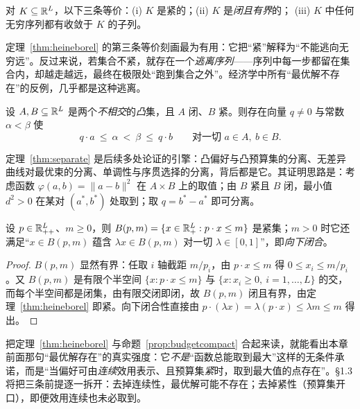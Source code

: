 \begin{theorem}\label{thm:heineborel}
对 $K\subseteq\mathbb{R}^{L}$，以下三条等价：(i) $K$ 是紧的；(ii) $K$ 是\emph{闭且有界}的；
(iii) $K$ 中任何无穷序列都有收敛于 $K$ 的子列。
\end{theorem}

定理~\ref{thm:heineborel} 的第三条等价刻画最为有用：它把“紧”解释为“不能逃向无穷远”。反过来说，若集合不紧，就存在一个\emph{逃离序列}——序列中每一步都留在集合内，却越走越远，最终在极限处“跑到集合之外”。经济学中所有“最优解不存在”的反例，几乎都是这种逃离。

\begin{theorem}\label{thm:separate}
设 $A,B\subseteq\mathbb{R}^{L}$ 是两个\emph{不相交}的\emph{凸}集，且 $A$ 闭、$B$ 紧。则存在向量 $q\neq 0$ 与常数 $\alpha<\beta$ 使
\[
q\cdot a\ \le\ \alpha\ <\ \beta\ \le\ q\cdot b\qquad
\text{对一切 }a\in A,\ b\in B.
\]
\end{theorem}

定理~\ref{thm:separate} 是后续多处论证的引擎：凸偏好与凸预算集的分离、无差异曲线对最优束的分离、单调性与序贯选择的分离，背后都是它。其证明思路是：考虑函数 $\varphi(a,b)=\|a-b\|^{2}$ 在 $A\times B$ 上的取值；由 $B$ 紧且 $B$ 闭，最小值 $d^{2}>0$ 在某对 $(a^{*},b^{*})$ 处取到；取 $q=b^{*}-a^{*}$ 即可分离。

\begin{proposition}[预算集是紧集]\label{prop:budgetcompact}
设 $p\in\mathbb{R}_{++}^{L}$、$m\ge 0$，则 $B(p,m)=\{x\in\mathbb{R}^{L}_{+}:p\cdot x\le m\}$ 是紧集；$m>0$ 时它还满足“$x\in B(p,m)$ 蕴含 $\lambda x\in B(p,m)$ 对一切 $\lambda\in[0,1]$”，即\emph{向下闭合}。
\end{proposition}

\begin{proof}
$B(p,m)$ 显然有界：任取 $i$ 轴截距 $m/p_i$，由 $p\cdot x\le m$ 得 $0\le x_i\le m/p_i$。又 $B(p,m)$ 是有限个半空间 $\{x:p\cdot x\le m\}$ 与 $\{x:x_i\ge 0,\ i=1,\dots,L\}$ 的交，而每个半空间都是闭集，由有限交闭即闭，故 $B(p,m)$ 闭且有界，由定理~\ref{thm:heineborel} 即紧。向下闭合性直接由 $p\cdot(\lambda x)=\lambda(p\cdot x)\le\lambda m\le m$ 得出。
\end{proof}

把定理~\ref{thm:heineborel} 与命题~\ref{prop:budgetcompact} 合起来读，就能看出本章前面那句“最优解存在”的真实强度：它\emph{不是}“函数总能取到最大”这样的无条件承诺，而是“当偏好可由\emph{连续}效用表示、且预算集\emph{紧}时，取到最大值的点存在”。§1.3 将把三条前提逐一拆开：去掉连续性，最优解可能不存在；去掉紧性（预算集开口），即便效用连续也未必取到。

